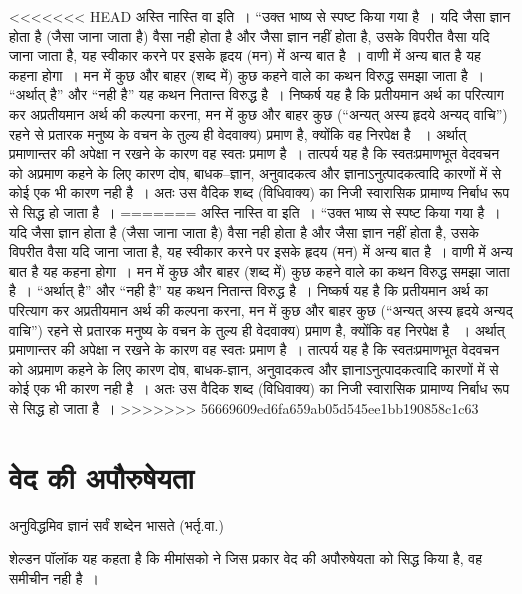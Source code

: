 <<<<<<< HEAD
अस्ति नास्ति वा इति~। “उक्त भाष्य से स्पष्ट किया गया है~। यदि जैसा ज्ञान होता है (जैसा जाना जाता है) वैसा नही होता है और जैसा ज्ञान नहीं होता है, उसके विपरीत वैसा यदि जाना जाता है, यह स्वीकार करने पर इसके हृदय (मन) में अन्य बात है~। वाणी में अन्य बात है यह कहना होगा~। मन में कुछ और बाहर (शब्द में) कुछ कहने वाले का कथन विरुद्ध समझा जाता है~। “अर्थात् है” और “नही है” यह कथन नितान्त विरुद्ध है~। निष्कर्ष यह है कि प्रतीयमान अर्थ का परित्याग कर अप्रतीयमान अर्थ की कल्पना करना, मन में कुछ और बाहर कुछ (“अन्यत् अस्य हृदये अन्यद् वाचि”) रहने से प्रतारक मनुष्य के वचन के तुल्य ही वेदवाक्य) प्रमाण है, क्योंकि वह निरपेक्ष है ~। अर्थात् प्रमाणान्तर की अपेक्षा न रखने के कारण वह स्वतः प्रमाण है~। तात्पर्य यह है कि स्वतःप्रमाणभूत वेदवचन को अप्रमाण कहने के लिए कारण दोष, बाधक–ज्ञान, अनुवादकत्व और ज्ञानाऽनुत्पादकत्वादि कारणों में से कोई एक भी कारण नही है~। अतः उस वैदिक शब्द (विधिवाक्य) का निजी स्वारासिक प्रामाण्य निर्बाध रूप से सिद्ध हो जाता है~।
=======
अस्ति नास्ति वा इति~। “उक्त भाष्य से स्पष्ट किया गया है~। यदि जैसा ज्ञान होता है (जैसा जाना जाता है) वैसा नही होता है और जैसा ज्ञान नहीं होता है, उसके विपरीत वैसा यदि जाना जाता है, यह स्वीकार करने पर इसके हृदय (मन) में अन्य बात है~। वाणी में अन्य बात है यह कहना होगा~। मन में कुछ और बाहर (शब्द में) कुछ कहने वाले का कथन विरुद्ध समझा जाता है~। “अर्थात् है” और “नही है” यह कथन नितान्त विरुद्ध है~। निष्कर्ष यह है कि प्रतीयमान अर्थ का परित्याग कर अप्रतीयमान अर्थ की कल्पना करना, मन में कुछ और बाहर कुछ (“अन्यत् अस्य हृदये अन्यद् वाचि”) रहने से प्रतारक मनुष्य के वचन के तुल्य ही वेदवाक्य) प्रमाण है, क्योंकि वह निरपेक्ष है ~। अर्थात् प्रमाणान्तर की अपेक्षा न रखने के कारण वह स्वतः प्रमाण है~। तात्पर्य यह है कि स्वतःप्रमाणभूत वेदवचन को अप्रमाण कहने के लिए कारण दोष, बाधक-ज्ञान, अनुवादकत्व और ज्ञानाऽनुत्पादकत्वादि कारणों में से कोई एक भी कारण नही है~। अतः उस वैदिक शब्द (विधिवाक्य) का निजी स्वारासिक प्रामाण्य निर्बाध रूप से सिद्ध हो जाता है~।
>>>>>>> 56669609ed6fa659ab05d545ee1bb190858c1c63


\section*{वेद की अपौरुषेयता}

अनुविद्धमिव ज्ञानं सर्वं शब्देन भासते (भर्तृ.वा.)

शेल्डन पॉलॉक यह कहता है कि मीमांसको ने जिस प्रकार वेद की अपौरुषेयता को सिद्ध किया है, वह समीचीन नही है~।

